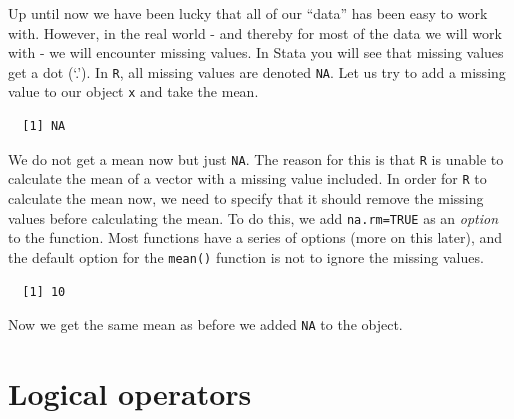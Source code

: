 \documentclass[12pt,oneside]{reedthesis}
\theoremstyle{definition}
\theoremstyle{definition}
\theoremstyle{definition}
\theoremstyle{remark}
\begin{document}
  Up until now we have been lucky that all of our ``data'' has been easy
  to work with. However, in the real world - and thereby for most of the
  data we will work with - we will encounter missing values. In Stata you
  will see that missing values get a dot (`.'). In \texttt{R}, all missing
  values are denoted \texttt{NA}. Let us try to add a missing value to our
  object \texttt{x} and take the mean.
  \begin{Shaded}
  \begin{Highlighting}[]
  \StringTok{ }\NormalTok{)}
  
  \end{Highlighting}
  \end{Shaded}
  \begin{verbatim}
  [1] NA
  \end{verbatim}
  We do not get a mean now but just \texttt{NA}. The reason for this is
  that \texttt{R} is unable to calculate the mean of a vector with a
  missing value included. In order for \texttt{R} to calculate the mean
  now, we need to specify that it should remove the missing values before
  calculating the mean. To do this, we add \texttt{na.rm=TRUE} as an
  \emph{option} to the function. Most functions have a series of options
  (more on this later), and the default option for the \texttt{mean()}
  function is not to ignore the missing values.
  \begin{Shaded}
  \begin{Highlighting}[]
  \NormalTok{)}
  \end{Highlighting}
  \end{Shaded}
  \begin{verbatim}
  [1] 10
  \end{verbatim}
  Now we get the same mean as before we added \texttt{NA} to the object.
  
  \section{Logical operators}\label{logical-operators}
  
\end{document}
